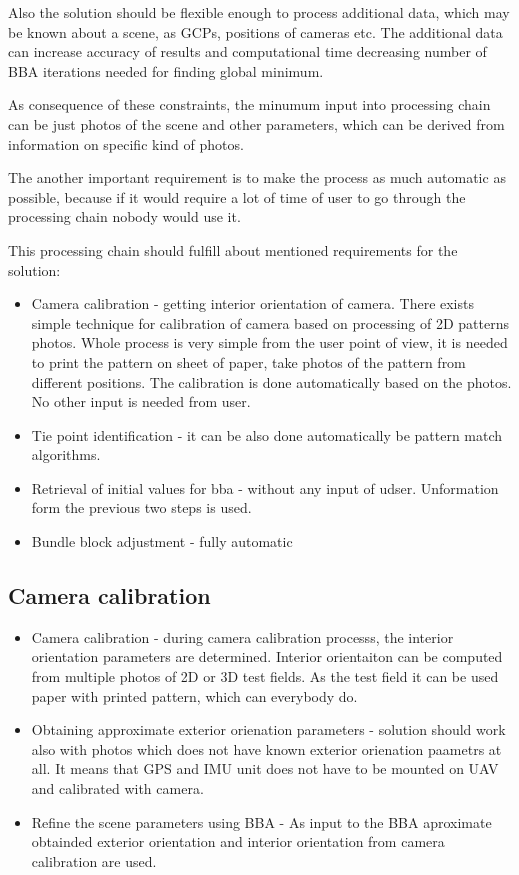 \documentclass[a4paper,12pt]{report}
\begin{document}
Also the solution should be flexible enough to process additional data, which may be known about a scene, 
as GCPs, positions of cameras etc. The additional data can
 increase accuracy of results and computational time  
 decreasing number of  BBA iterations needed for finding global minimum.

As consequence of these constraints, the minumum input into processing chain can be just photos
of the scene and other parameters, which can be derived from information on specific kind of photos.

The another important requirement is to make the process as much automatic as possible, because 
if it would require a lot of time of user to go through the processing chain nobody would use it.

This processing chain should fulfill about mentioned requirements for the solution:

\begin{itemize}
\item Camera calibration - getting interior orientation of camera. There exists simple technique for calibration
of camera based on processing of 2D patterns photos. Whole process is very simple from the user point of view, it is needed 
to print the pattern on sheet of paper, take photos of the pattern from different positions. The calibration 
is done automatically based on the photos. No other input is needed from user.
\item Tie point identification - it can be also done automatically be pattern match algorithms.
\item Retrieval of initial values for bba - without any input of udser. Unformation form the previous two steps is used.
\item Bundle block adjustment - fully automatic
\end{itemize}




\subsection{Camera calibration}
\begin{itemize}
\item Camera calibration - during camera calibration processs, the interior orientation parameters 
			   are determined.
		             Interior orientaiton can be computed 
			     from multiple photos of 2D or 3D test fields. As the test field it can be used 
			     paper with printed pattern, which can everybody do. 
				
\item Obtaining approximate exterior orienation parameters - solution should work also with photos 
which does not have known exterior orienation paametrs at all. It means 
that GPS and IMU unit does not have to be mounted on UAV and calibrated with camera.
  

\item Refine the scene parameters using BBA - As input to the BBA aproximate obtainded exterior orientation
and interior orientation from camera calibration are used.

\end{itemize}
\end{document}
